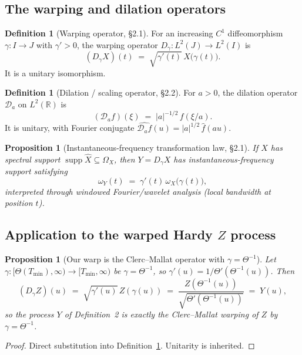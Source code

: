 \documentclass[11pt,a4paper]{article}
\theoremstyle{plain}
\newtheorem{proposition}[theorem]{Proposition}
\theoremstyle{definition}
\newtheorem{definition}[theorem]{Definition}
\newcommand{\R}{\mathbb{R}}
\DeclareMathOperator{\supp}{supp}
\begin{document}
\subsection{The warping and dilation operators}

\begin{definition}[Warping operator, \cite{ClercMallat} \S2.1]\label{def:Dgamma}
For an increasing $C^1$ diffeomorphism $\gamma:I\to J$ with $\gamma'>0$, the warping operator $D_\gamma:L^2(J)\to L^2(I)$ is
\[
(D_\gamma X)(t) \;=\; \sqrt{\gamma'(t)}\,X\bigl(\gamma(t)\bigr) .
\]
It is a unitary isomorphism.
\end{definition}

\begin{definition}[Dilation / scaling operator, \cite{ClercMallat} \S2.2]\label{def:Da}
For $a>0$, the dilation operator $\mathcal{D}_a$ on $L^2(\R)$ is
\[
(\mathcal{D}_a f)(\xi) \;=\; |a|^{-1/2}\,f(\xi/a) .
\]
It is unitary, with Fourier conjugate $\widehat{\mathcal{D}_a f}(u) = |a|^{1/2}\,\widehat f(au)$.
\end{definition}

\begin{proposition}[Instantaneous-frequency transformation law, \cite{ClercMallat} \S2.1]\label{prop:inst}
If $X$ has spectral support $\supp\widehat X \subseteq \Omega_X$, then $Y=D_\gamma X$ has instantaneous-frequency support satisfying
\[
\omega_Y(t) \;=\; \gamma'(t)\,\omega_X\bigl(\gamma(t)\bigr),
\]
interpreted through windowed Fourier/wavelet analysis (local bandwidth at position $t$).
\end{proposition}

\subsection{Application to the warped Hardy $Z$ process}

\begin{proposition}[Our warp is the Clerc--Mallat operator with $\gamma=\Theta^{-1}$]\label{prop:matchCM}
Let $\gamma:[\Theta(T_{\min}),\infty)\to[T_{\min},\infty)$ be $\gamma=\Theta^{-1}$, so $\gamma'(u)=1/\Theta'(\Theta^{-1}(u))$. Then
\[
(D_\gamma Z)(u) \;=\; \sqrt{\gamma'(u)}\,Z(\gamma(u)) \;=\; \frac{Z(\Theta^{-1}(u))}{\sqrt{\Theta'(\Theta^{-1}(u))}} \;=\; Y(u),
\]
so the process $Y$ of Definition~2 is exactly the Clerc--Mallat warping of $Z$ by $\gamma=\Theta^{-1}$.
\end{proposition}

\begin{proof}
Direct substitution into Definition~\ref{def:Dgamma}. Unitarity is inherited.
\end{proof}
\end{document}

